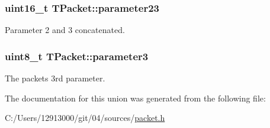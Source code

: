 \subsubsection[{parameter23}]{\setlength{\rightskip}{0pt plus 5cm}uint16\+\_\+t T\+Packet\+::parameter23}\label{union_t_packet_a92905f7e01f01bd1439dc4668b6808c1}
Parameter 2 and 3 concatenated. \hypertarget{union_t_packet_ab3ac2f9a6cfe5b6a7ae0987d21de472b}{}
\subsubsection[{parameter3}]{\setlength{\rightskip}{0pt plus 5cm}uint8\+\_\+t T\+Packet\+::parameter3}\label{union_t_packet_ab3ac2f9a6cfe5b6a7ae0987d21de472b}
The packet\textquotesingle{}s 3rd parameter. 

The documentation for this union was generated from the following file\+:\begin{DoxyCompactItemize}
\item 
C\+:/\+Users/12913000/git/04/sources/\hyperlink{packet_8h}{packet.\+h}\end{DoxyCompactItemize}
